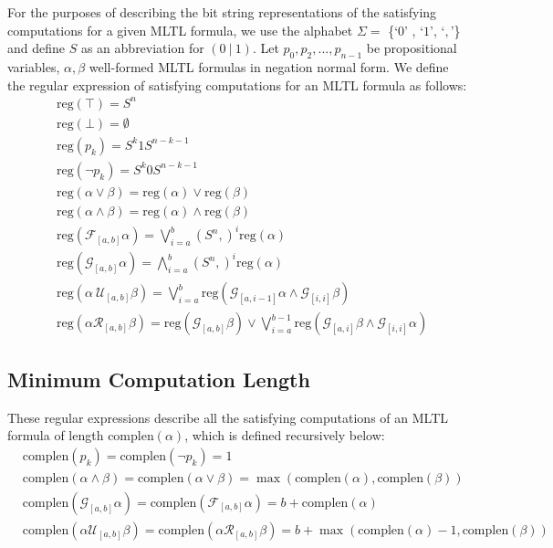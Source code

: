 \documentclass[runningheads]{llncs}
\begin{document}
For the purposes of describing the bit string representations of the satisfying computations for a given MLTL formula, we use the alphabet $\Sigma =$ \{`$0$' , `$1$', `$,$'\} and define $S$ as an abbreviation for $(0 \ | \ 1)$.
Let $p_0, p_2, ..., p_{n-1}$ be propositional variables, $\alpha, \beta$ well-formed MLTL formulas in negation normal form. We define the regular expression of satisfying computations for an MLTL formula as follows:
 \begin{align}
     &\text{reg}(\top) = S^n\\
     &\text{reg}(\bot) = \emptyset \\
     &\text{reg}(p_k) = S^{k}1S^{n-k-1} \\
     &\text{reg}(\neg p_k) = S^{k}0S^{n-k-1} \\
     &\text{reg}(\alpha \lor \beta) =  \text{reg}(\alpha) \lor \text{reg}(\beta)\\
     &\text{reg}(\alpha \land \beta) = \text{reg}(\alpha) \land \text{reg}(\beta) \\
    &\text{reg}(\mathcal{F}_{[a,b]} \alpha) = \bigvee_{i=a}^{b} (S^n,)^i \text{reg}(\alpha) \\
     &\text{reg}(\mathcal{G}_{[a,b]} \alpha) = \bigwedge_{i=a}^{b} (S^n,)^i \text{reg}(\alpha)\\
     &\text{reg}(\alpha \ \mathcal{U}_{[a,b]} \beta) =  \bigvee_{i=a}^{b} \text{reg}\left(\mathcal{G}_{[a,i-1]}\alpha \land \mathcal{G}_{[i, i]} \beta\right) \\
     &\text{reg}(\alpha \mathcal{R}_{[a,b]} \beta) =  \text{reg}\left(\mathcal{G}_{[a,b]}\beta\right) \lor \bigvee_{i=a}^{b-1} \text{reg}\left(\mathcal{G}_{[a,i]}\beta \land \mathcal{G}_{[i, i]} \alpha\right) \label{release}
 \end{align}
 
 \subsection{Minimum Computation Length}
 These regular expressions describe all the satisfying computations of an MLTL formula of length $\text{complen}(\alpha)$, which is defined recursively below:
\begin{align}
    &\text{complen}(p_k) = \text{complen}(\neg p_k) = 1\\
    &\text{complen}(\alpha \land \beta) = \text{complen}(\alpha \lor \beta) = \max(\text{complen}(\alpha), \text{complen}(\beta))\\
    &\text{complen}(\mathcal{G}_{[a,b]} \alpha) = \text{complen}(\mathcal{F}_{[a,b]} \alpha) = b + \text{complen}(\alpha)\\
    &\text{complen}(\alpha \mathcal{U}_{[a,b]} \beta) = \text{complen}(\alpha \mathcal{R}_{[a,b]} \beta) = b + \max(\text{complen}(\alpha)-1, \text{complen}(\beta))
\end{align}
 
\end{document}
